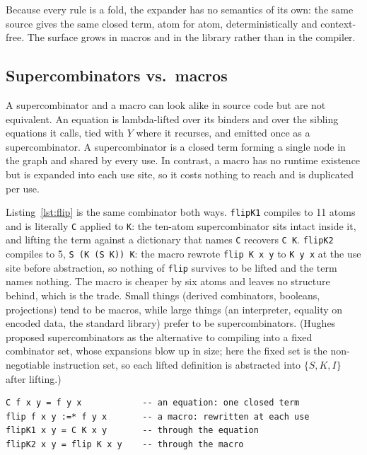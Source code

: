 \documentclass[english,submission,code=tt]{programming}
\begin{document}
Because every rule is a fold, the expander has no semantics of its own: 
the same source gives the same closed term, atom for atom, 
deterministically and context-free.  The surface grows in macros and in 
the library rather than in the compiler.

\subsection{Supercombinators vs.\ macros}\label{sec:supercombinators-vs-macros}

A supercombinator and a macro can look alike in source code but are not
equivalent.  An equation is lambda-lifted over its binders and over the 
sibling equations it calls, tied with $Y$ where it recurses, and 
emitted once as a supercombinator.  A supercombinator is a closed term 
forming a single node in the graph and shared by every use.  In 
contrast, a macro has no runtime existence but is expanded into each 
use site, so it costs nothing to reach and is duplicated per use.  

Listing~\ref{lst:flip} is the same combinator both ways.
\texttt{flipK1} compiles to 11 atoms and is literally
\texttt{C} applied to \texttt{K}: the ten-atom supercombinator sits
intact inside it, and lifting the term against a dictionary that names
\texttt{C} recovers \texttt{C K}.  \texttt{flipK2} compiles to 5,
\mbox{\texttt{S (K (S K)) K}}: the macro rewrote \texttt{flip K x y} to
\texttt{K y x} at the use site before abstraction, so nothing of
\texttt{flip} survives to be lifted and the term names nothing.  The
macro is cheaper by six atoms and leaves no structure behind, which is
the trade.
Small things (derived combinators, booleans, projections) tend to be 
macros, while large things (an interpreter, equality on encoded data, 
the standard library) prefer to be supercombinators.  (Hughes proposed 
supercombinators as the alternative to compiling into a fixed 
combinator set, whose expansions blow up in size; here the fixed set is 
the non-negotiable instruction set, so each lifted definition is 
abstracted into $\{S,K,I\}$ after lifting.)

\begin{lstlisting}[label=lst:flip,float=h!,
                   caption={One combinator as a supercombinator and as a
                   macro, and a use of each.}]
C f x y = f y x            -- an equation: one closed term
flip f x y :=* f y x       -- a macro: rewritten at each use
flipK1 x y = C K x y       -- through the equation
flipK2 x y = flip K x y    -- through the macro
\end{lstlisting}
\end{document}
